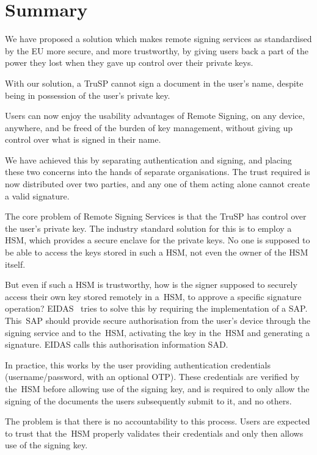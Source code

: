 \chapter*{Summary}
We have proposed a solution which makes remote signing services as standardised by the \gls{EU} more secure,
and more trustworthy,
by giving users back a part of the power they lost when they gave up control over their private keys.

With our solution,
a \gls{TruSP} cannot sign a document in the user's name,
despite being in possession of the user's private key.

Users can now enjoy the usability advantages of Remote Signing,
on any device, anywhere,
and be freed of the burden of key management,
without giving up control over what is signed in their name.

We have achieved this by separating authentication and signing,
and placing these two concerns into the hands of separate organisations.
The trust required is now distributed over two parties,
and any one of them acting alone cannot create a valid signature.

The core problem of Remote Signing Services is that the \gls{TruSP} has control over the user's private key.
The industry standard solution for this is to employ a \gls{HSM},
which provides a secure enclave for the private keys.
No one is supposed to be able to access the keys stored in such a \gls{HSM},
not even the owner of the \gls{HSM} itself.

But even if such a \gls{HSM} is trustworthy,
how is the signer supposed to securely access their own key stored remotely in a~\gls{HSM},
to approve a specific signature operation? EIDAS~\cite{eidas} tries to solve this by requiring the implementation of a \gls{SAP}.
This~\gls{SAP} should provide secure authorisation from the user's device through the signing service and to the~\gls{HSM},
activating the key in the~\gls{HSM} and generating a signature.
EIDAS calls this authorisation information \gls{SAD}.

In practice,
this works by the user providing authentication credentials (username/password, with an optional \gls{OTP}).
These credentials are verified by the~\gls{HSM} before allowing use of the signing key,
and is required to only allow the signing of the documents the users subsequently submit to it, and no others.

The problem is that there is no accountability to this process.
Users are expected to trust that the~\gls{HSM} properly validates their credentials and only then
allows use of the signing key.

